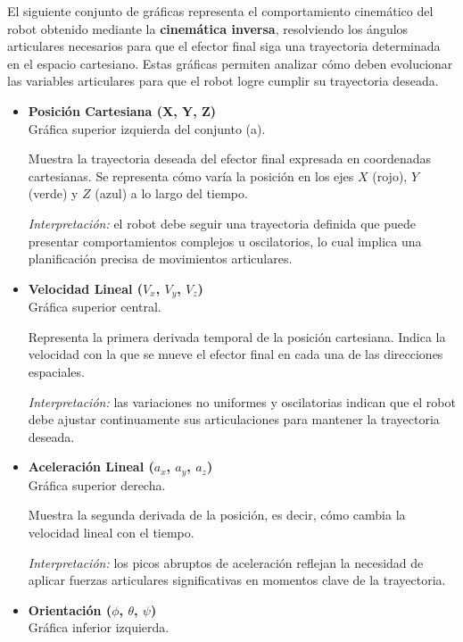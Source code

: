 El siguiente conjunto de gráficas representa el comportamiento cinemático del robot obtenido mediante la \textbf{cinemática inversa}, resolviendo los ángulos articulares necesarios para que el efector final siga una trayectoria determinada en el espacio cartesiano. Estas gráficas permiten analizar cómo deben evolucionar las variables articulares para que el robot logre cumplir su trayectoria deseada.

\begin{itemize}
	\item \textbf{Posición Cartesiana (X, Y, Z)}\\
	Gráfica superior izquierda del conjunto (a).
	
	Muestra la trayectoria deseada del efector final expresada en coordenadas cartesianas. Se representa cómo varía la posición en los ejes $X$ (rojo), $Y$ (verde) y $Z$ (azul) a lo largo del tiempo.
	
	\textit{Interpretación:} el robot debe seguir una trayectoria definida que puede presentar comportamientos complejos u oscilatorios, lo cual implica una planificación precisa de movimientos articulares.
	
	\item \textbf{Velocidad Lineal ($V_x$, $V_y$, $V_z$)}\\
	Gráfica superior central.
	
	Representa la primera derivada temporal de la posición cartesiana. Indica la velocidad con la que se mueve el efector final en cada una de las direcciones espaciales.
	
	\textit{Interpretación:} las variaciones no uniformes y oscilatorias indican que el robot debe ajustar continuamente sus articulaciones para mantener la trayectoria deseada.
	
	\item \textbf{Aceleración Lineal ($a_x$, $a_y$, $a_z$)}\\
	Gráfica superior derecha.
	
	Muestra la segunda derivada de la posición, es decir, cómo cambia la velocidad lineal con el tiempo.
	
	\textit{Interpretación:} los picos abruptos de aceleración reflejan la necesidad de aplicar fuerzas articulares significativas en momentos clave de la trayectoria.
	
	\item \textbf{Orientación ($\phi$, $\theta$, $\psi$)}\\
	Gráfica inferior izquierda.
	

\end{itemize}
